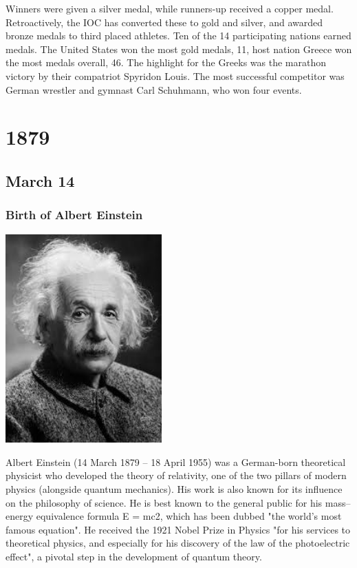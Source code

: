 \documentclass[11pt]{report}
\begin{document}
Winners were given a silver medal, while runners-up received a copper medal. Retroactively, the IOC has converted these to gold and silver, and awarded bronze medals to third placed athletes. Ten of the 14 participating nations earned medals. The United States won the most gold medals, 11, host nation Greece won the most medals overall, 46. The highlight for the Greeks was the marathon victory by their compatriot Spyridon Louis. The most successful competitor was German wrestler and gymnast Carl Schuhmann, who won four events.


\chapter{1879}
\section{March 14}
\subsection{Birth of Albert Einstein}
\vspace{2mm}\begin{center}\includegraphics[width=6cm]{./img/einstein.jpg}\end{center}
Albert Einstein (14 March 1879 – 18 April 1955) was a German-born theoretical physicist who developed the theory of relativity, one of the two pillars of modern physics (alongside quantum mechanics). His work is also known for its influence on the philosophy of science. He is best known to the general public for his mass–energy equivalence formula E = mc2, which has been dubbed "the world's most famous equation". He received the 1921 Nobel Prize in Physics "for his services to theoretical physics, and especially for his discovery of the law of the photoelectric effect", a pivotal step in the development of quantum theory.
\end{document}
